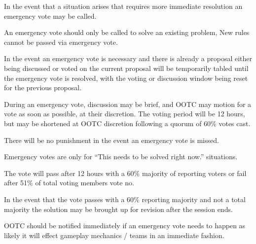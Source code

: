 \begin{deepEnumerate}
    \item In the event that a situation arises that requires more immediate resolution an emergency vote may be called.
    \begin{deepEnumerate}
        \item An emergency vote should only be called to solve an existing problem, New rules cannot be passed via emergency vote.
        \item In the event an emergency vote is necessary and there is already a proposal either being discussed or voted on the current proposal will be temporarily
        tabled until the emergency vote is resolved, with the voting or discussion window being reset for the previous proposal.
        \item During an emergency vote, discussion may be brief, and OOTC may motion for a vote as soon as possible, at their discretion. 
        The voting period will be 12 hours, but may be shortened at OOTC discretion following a quorum of 60\% votes cast.
        \begin{deepEnumerate}
            \item There will be no punishment in the event an emergency vote is missed.
        \end{deepEnumerate}
        \item Emergency votes are only for  “This needs to be solved right now.” situations.
        \begin{deepEnumerate}
            \item The vote will pass after 12 hours with a 60\% majority of reporting voters or fail after 51\% of total voting members vote no.
            \item In the event that the vote passes with a 60\% reporting majority and not a total majority the solution may be brought up for revision after the session ends.
        \end{deepEnumerate}
        \item OOTC should be notified immediately if an emergency vote needs to happen as likely it will effect gameplay mechanics / teams in an immediate fashion.
    \end{deepEnumerate}
\end{deepEnumerate}

